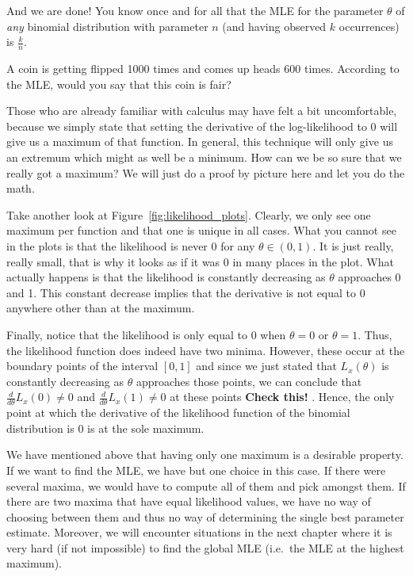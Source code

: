 And we are done! You know once and for all that the MLE for the parameter $\theta$ of \emph{any} binomial distribution with parameter $n$ (and having observed $k$ occurrences) is $ \frac{k}{n} $.

\begin{Exercise}
A coin is getting flipped 1000 times and comes up heads 600 times. According to the MLE, would you say that this coin is fair?
\end{Exercise}

Those who are already familiar with calculus may have felt a bit uncomfortable, because we simply state that setting the derivative of the log-likelihood
to 0 will give us a maximum of that function. In general, this technique will only give us an extremum which might as well be a minimum. How can we be so sure that
we really got a maximum? We will just do a proof by picture here and let you do the math. 

Take another look at Figure~\ref{fig:likelihood_plots}. Clearly, we only
see one maximum per function and that one is unique in all cases. 
What you cannot see in the plots is that the likelihood is never 0 for any $ \theta \in (0,1) $. It is just
really, really small, that is why it looks as if it was 0 in many places in the plot. What actually happens is that the likelihood is constantly decreasing as
$ \theta $ approaches 0 and 1. This constant decrease implies that the derivative is not equal to $ 0 $ anywhere other than at the maximum.

Finally, notice that the likelihood is only equal to 0 when $ \theta = 0 $ or $ \theta = 1 $. 
Thus, the likelihood function does indeed have two minima. However, these 
occur at the boundary points of the interval $ [0,1] $ and since we just stated that $ L_{x}(\theta) $ is constantly decreasing as $ \theta $ approaches those points,
we can conclude that $ \frac{d}{d\theta}L_{x}(0) \not = 0 $ and $ \frac{d}{d\theta}L_{x}(1) \not = 0 $ at these points \textbf{Check this! }. Hence, the only point at which the
derivative of the likelihood function of the binomial distribution is $ 0 $ is at the sole maximum.

We have mentioned above that having only one maximum is a desirable property. If we want to find the MLE, we have but one choice in this case. If there were
several maxima, we would have to compute all of them and pick amongst them. If there are two maxima that have equal likelihood values, we have no way of choosing
between them and thus no way of determining the single best parameter estimate. Moreover, we will encounter situations in the next chapter where it is very hard (if not
impossible) to find the global MLE (i.e.\ the MLE at the highest maximum).

